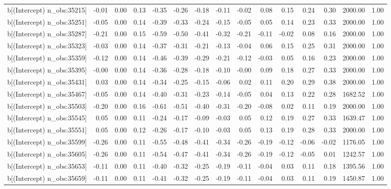 \begin{table}[ht]
\begin{tabular}{rrrrrrrrrrrrrrr}
  b[(Intercept) n\_obs:35215] & -0.01 & 0.00 & 0.13 & -0.35 & -0.26 & -0.18 & -0.11 & -0.02 & 0.08 & 0.15 & 0.24 & 0.30 & 2000.00 & 1.00 \\ 
  b[(Intercept) n\_obs:35251] & -0.05 & 0.00 & 0.14 & -0.39 & -0.33 & -0.24 & -0.15 & -0.05 & 0.05 & 0.14 & 0.23 & 0.33 & 2000.00 & 1.00 \\ 
  b[(Intercept) n\_obs:35287] & -0.21 & 0.00 & 0.15 & -0.59 & -0.50 & -0.41 & -0.32 & -0.21 & -0.11 & -0.02 & 0.08 & 0.16 & 2000.00 & 1.00 \\ 
  b[(Intercept) n\_obs:35323] & -0.03 & 0.00 & 0.14 & -0.37 & -0.31 & -0.21 & -0.13 & -0.04 & 0.06 & 0.15 & 0.25 & 0.31 & 2000.00 & 1.00 \\ 
  b[(Intercept) n\_obs:35359] & -0.12 & 0.00 & 0.14 & -0.46 & -0.39 & -0.29 & -0.21 & -0.12 & -0.03 & 0.05 & 0.16 & 0.23 & 2000.00 & 1.00 \\ 
  b[(Intercept) n\_obs:35395] & -0.00 & 0.00 & 0.14 & -0.36 & -0.28 & -0.18 & -0.10 & -0.00 & 0.09 & 0.18 & 0.27 & 0.33 & 2000.00 & 1.00 \\ 
  b[(Intercept) n\_obs:35431] & 0.03 & 0.00 & 0.14 & -0.34 & -0.25 & -0.15 & -0.06 & 0.02 & 0.11 & 0.20 & 0.29 & 0.38 & 2000.00 & 1.00 \\ 
  b[(Intercept) n\_obs:35467] & -0.05 & 0.00 & 0.14 & -0.40 & -0.31 & -0.23 & -0.14 & -0.05 & 0.04 & 0.13 & 0.22 & 0.28 & 1682.52 & 1.00 \\ 
  b[(Intercept) n\_obs:35503] & -0.20 & 0.00 & 0.16 & -0.61 & -0.51 & -0.40 & -0.31 & -0.20 & -0.08 & 0.02 & 0.11 & 0.19 & 2000.00 & 1.00 \\ 
  b[(Intercept) n\_obs:35545] & 0.05 & 0.00 & 0.11 & -0.24 & -0.17 & -0.09 & -0.03 & 0.05 & 0.12 & 0.19 & 0.27 & 0.33 & 1639.47 & 1.00 \\ 
  b[(Intercept) n\_obs:35551] & 0.05 & 0.00 & 0.12 & -0.26 & -0.17 & -0.10 & -0.03 & 0.05 & 0.13 & 0.19 & 0.28 & 0.33 & 2000.00 & 1.00 \\ 
  b[(Intercept) n\_obs:35599] & -0.26 & 0.00 & 0.11 & -0.55 & -0.48 & -0.41 & -0.34 & -0.26 & -0.19 & -0.12 & -0.06 & -0.02 & 1176.05 & 1.00 \\ 
  b[(Intercept) n\_obs:35605] & -0.26 & 0.00 & 0.11 & -0.54 & -0.47 & -0.41 & -0.34 & -0.26 & -0.19 & -0.12 & -0.05 & 0.01 & 1242.57 & 1.00 \\ 
  b[(Intercept) n\_obs:35653] & -0.11 & 0.00 & 0.11 & -0.40 & -0.32 & -0.25 & -0.19 & -0.11 & -0.04 & 0.03 & 0.11 & 0.18 & 1395.56 & 1.00 \\ 
  b[(Intercept) n\_obs:35659] & -0.11 & 0.00 & 0.11 & -0.41 & -0.32 & -0.25 & -0.19 & -0.11 & -0.04 & 0.03 & 0.11 & 0.19 & 1450.87 & 1.00 \\ 

\end{tabular}
\end{table}
